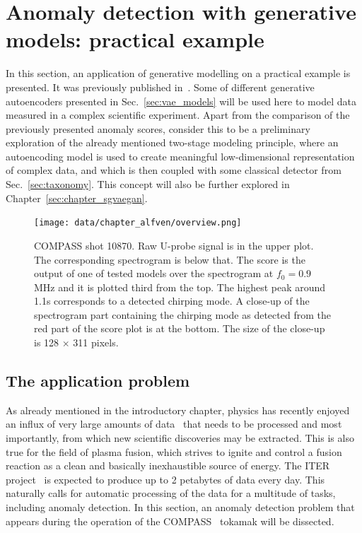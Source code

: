 \section{Anomaly detection with generative models: practical example} \label{sec:alfven}
In this section, an application of generative modelling on a practical example is presented. It was previously published in~\cite{vskvara2020detection}. Some of different generative autoencoders presented in Sec.~\ref{sec:vae_models} will be used here to model data measured in a complex scientific experiment. Apart from the comparison of the previously presented anomaly scores, consider this to be a preliminary exploration of the already mentioned two-stage modeling principle, where an autoencoding model is used to create meaningful low-dimensional representation of complex data, and which is then coupled with some classical detector from Sec.~\ref{sec:taxonomy}. This concept will also be further explored in Chapter~\ref{sec:chapter_sgvaegan}.

\begin{figure}[t]%
  \centering
  \texttt{[image: data/chapter\_alfven/overview.png]}
  \caption{COMPASS shot 10870. Raw U-probe signal is in the upper plot. The corresponding spectrogram is below that. The score is the output of one of tested models over the spectrogram at $f_0=0.9$ MHz and it is plotted third from the top. The highest peak around 1.1s corresponds to a detected chirping mode. A close-up of the spectrogram part containing the chirping mode as detected from the red part of the score plot is at the bottom. The size of the close-up is 128 $\times$ 311 pixels.}
  \label{fig:psd}
\end{figure}

\subsection{The application problem}
As already mentioned in the introductory chapter, physics has recently enjoyed an influx of very large amounts of data~\cite{bird2011computing,ball2010data} that needs to be processed and most importantly, from which new scientific discoveries may be extracted. This is also true for the field of plasma fusion, which strives to ignite and control a fusion reaction as a clean and basically inexhaustible source of energy. The ITER project~\cite{holtkamp2007overview} is expected to produce up to 2 petabytes of data every day. This naturally calls for automatic processing of the data for a multitude of tasks, including anomaly detection. In this section, an anomaly detection problem that appears during the operation of the COMPASS~\cite{panek2015status} tokamak will be dissected.

